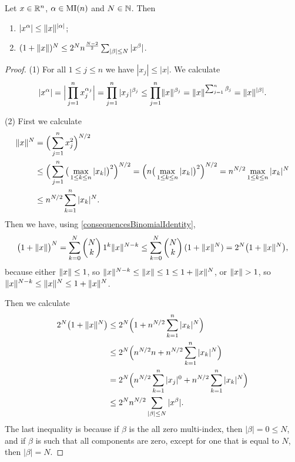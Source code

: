\begin{lemma} \label{SchwartzBoundedLemma}
Let $x\in \mathbb{R}^n$, $\alpha\in\operatorname{MI}(n)$ and $N\in \mathbb{N}$. Then
\begin{enumerate}
\item $|x^\alpha| \leq \lVert x\rVert^{|\alpha|}$;
\item $(1+\lVert x\rVert)^N \leq 2^N n^{\frac{N-2}{2}}\sum_{|\beta|\leq N}|x^\beta|$.
\end{enumerate}
\end{lemma}
\begin{proof}
(1) For all $1\leq j\leq n$ we have $|x_j| \leq |x|$. We calculate
\[ |x^\alpha| = \Big|\prod_{j=1}^n x_j^{\alpha_j}\Big| = \prod_{j=1}^n |x_j|^{\beta_j} \leq \prod_{j=1}^n \lVert x\rVert^{\beta_j} = \lVert x\rVert^{\sum_{j=1}^n\beta_j} = \lVert x\rVert^{|\beta|}. \]

(2) First we calculate
\begin{align*}
\lVert x\rVert^N &= \Big(\sum_{j=1}^n x_j^2\Big)^{N/2} \\
&\leq \Big(\sum_{j=1}^n \big(\max_{1\leq k\leq n}|x_k|\big)^2\Big)^{N/2} = \Big(n\big(\max_{1\leq k\leq n}|x_k|\big)^2\Big)^{N/2} = n^{N/2}\max_{1\leq k\leq n}|x_k|^N \\
&\leq n^{N/2}\sum_{k=1}^n |x_k|^N.
\end{align*}
Then we have, using \ref{consequencesBinomialIdentity},
\[ \big(1+\lVert x\rVert\big)^N  = \sum_{k=0}^N \begin{pmatrix}
N \\ k
\end{pmatrix}1^k\lVert x\rVert^{N-k} \leq \sum_{k=0}^N \begin{pmatrix}
N \\ k
\end{pmatrix}(1 + \lVert x\rVert^N) = 2^N\big(1+\lVert x\rVert^N\big), \]
because either $\lVert x\rVert\leq 1$, so $\lVert x\rVert^{N-k} \leq \lVert x\rVert\leq 1 \leq 1+\lVert x\rVert^N$, or $\lVert x\rVert > 1$, so $\lVert x\rVert^{N-k} \leq \lVert x\rVert^N \leq 1+\lVert x\rVert^N$.

Then we calculate
\begin{align*}
2^N\big(1+\lVert x\rVert^N\big) &\leq 2^N\Big(1+n^{N/2}\sum_{k=1}^n |x_k|^N\Big) \\
&\leq 2^N\Big(n^{N/2}n+n^{N/2}\sum_{k=1}^n |x_k|^N\Big) \\
&= 2^N\Big(n^{N/2}\sum_{k=1}^n|x_j|^0+n^{N/2}\sum_{k=1}^n |x_k|^N\Big) \\
&\leq 2^Nn^{N/2}\sum_{|\beta|\leq N}|x^\beta|.
\end{align*}
The last inequality is because if $\beta$ is the all zero multi-index, then $|\beta| = 0 \leq N$, and if $\beta$ is such that all components are zero, except for one that is equal to $N$, then $|\beta| = N$.
\end{proof}

